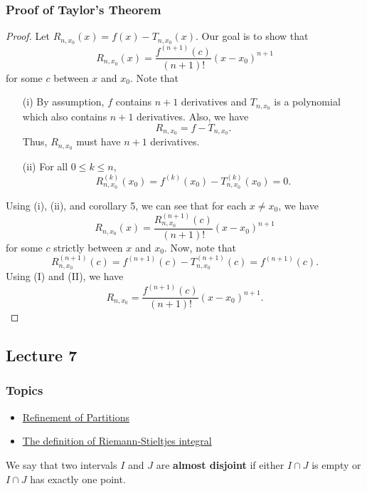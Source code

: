 \subsubsection{Proof of Taylor's Theorem}
\begin{proof}
Let \( {R}_{n,{x}_{0}}(x) = f(x) - {T}_{n,{x}_{0}}(x)  \). Our goal is to show that 
\[  {R}_{n,{x}_{0}}(x) = \frac{ f^{(n+1)}(c) }{ (n+1)! } (x - {x}_{0})^{n+1} \]
for some \( c  \) between \( x  \) and \( {x}_{0} \). Note that 
\begin{enumerate}
    \item[(i)] By assumption, \( f \) contains \( n + 1  \) derivatives and \( {T}_{n,{x}_{0}}  \) is a polynomial which also contains \( n + 1  \) derivatives. Also, we have 
        \[  {R}_{n,{x}_{0}} = f - {T}_{n,{x}_{0}}. \]
        Thus, \( {R}_{n,{x}_{0}}  \) must have \( n + 1  \) derivatives.
    \item[(ii)] For all \( 0 \leq k \leq n  \),
        \[  {R}_{n, {x}_{0}}^{(k)}({x}_{0}) = f^{(k)}({x}_{0}) - {T}_{n,{x}_{0}}^{(k)}({x}_{0}) = 0. \]
\end{enumerate}
Using (i), (ii), and corollary 5, we can see that for each \( x \neq {x}_{0} \), we have 
\[  R_{n,{x}_{0}}(x) = \frac{ {R}_{n,{x}_{0}}^{(n+1)}(c) }{ (n+1)! }  (x - {x}_{0})^{n+1} \tag{I} \]
for some \( c  \) strictly between \( x  \) and \( {x}_{0} \). Now, note that 
\[  {R}_{n,{x}_{0}}^{(n+1)}(c) = f^{(n+1)}(c) - {T}_{n,{x}_{0}}^{(n+1)}(c) = f^{(n+1)}(c). \tag{II}  \]
Using (I) and (II), we have 
\[  {R}_{n,{x}_{0}} = \frac{ f^{(n+1)}(c) }{ (n+1)! } (x - {x}_{0})^{n+1}.\]
\end{proof}

\subsection{Lecture 7}

\subsubsection{Topics}

\begin{itemize}
    \item {\hyperref[Refinement of Partitions]{Refinement of Partitions}}
    \item {\hyperref[The definition of Riemann-Stieltjes integral]{The definition of Riemann-Stieltjes integral}}
\end{itemize}

\begin{definition}
    We say that two intervals \( I  \) and \( J  \) are \textbf{almost disjoint} if either \( I \cap J  \) is empty or \(  I \cap J  \) has exactly one point.
\end{definition}

